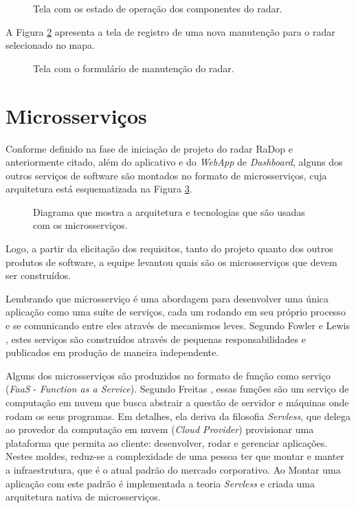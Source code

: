 \begin{figure}[H]
	\caption{\label{fig:status} Tela com os estado de operação dos componentes do radar.}
\end{figure}

A Figura \ref{fig:manutencao-app} apresenta a tela de registro de uma nova manutenção para o radar selecionado no mapa.

\begin{figure}[H]
	\caption{\label{fig:manutencao-app} Tela com o formulário de manutenção do radar.}
\end{figure}


\section{Microsserviços}

Conforme definido na fase de iniciação de projeto do radar RaDop e anteriormente citado, além do aplicativo e do \textit{WebApp} de \textit{Dashboard}, alguns dos outros serviços de software são montados no formato de microsserviços, cuja arquitetura está esquematizada na Figura \ref{fig:diagrama-arq-microsservicos}.

\begin{figure}[H]
	\caption{\label{fig:diagrama-arq-microsservicos} Diagrama que mostra a arquitetura e tecnologias que são usadas com os microsserviços.}
\end{figure}

Logo, a partir da elicitação dos requisitos, tanto do projeto quanto dos outros produtos de software, a equipe levantou quais são os microsserviços que devem ser construídos. 

Lembrando que microsserviço é uma abordagem para desenvolver uma única aplicação como uma suíte de serviços, cada um rodando em seu próprio processo e se comunicando entre eles através de mecanismos leves. Segundo Fowler e Lewis \cite{fowler2015}, estes serviços são construídos através de pequenas responsabilidades e publicados em produção de maneira independente.

Alguns dos microsserviços são produzidos no formato de função como serviço (\textit{FaaS} - \textit{Function as a Service}). Segundo Freitas \cite{freitas2018}, essas funções são um serviço de computação em nuvem que busca abstrair a questão de servidor e máquinas onde rodam os seus programas. Em detalhes, ela deriva da filosofia \textit{Servless}, que delega ao provedor da computação em nuvem (\textit{Cloud Provider}) provisionar uma plataforma que permita ao cliente: desenvolver, rodar e gerenciar aplicações. Nestes moldes, reduz-se a complexidade de uma pessoa ter que montar e manter a infraestrutura, que é o atual padrão do mercado corporativo. Ao Montar uma aplicação com este padrão é implementada a teoria \textit{Servless} e criada uma arquitetura nativa de microsserviços.

